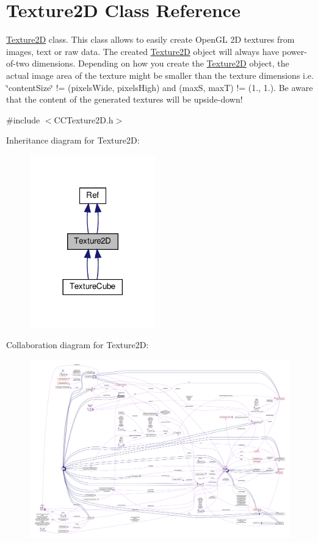 \hypertarget{classTexture2D}{}\section{Texture2D Class Reference}
\label{classTexture2D}


\hyperlink{classTexture2D}{Texture2D} class. This class allows to easily create Open\+GL 2D textures from images, text or raw data. The created \hyperlink{classTexture2D}{Texture2D} object will always have power-\/of-\/two dimensions. Depending on how you create the \hyperlink{classTexture2D}{Texture2D} object, the actual image area of the texture might be smaller than the texture dimensions i.\+e. \char`\"{}content\+Size\char`\"{} != (pixels\+Wide, pixels\+High) and (maxS, maxT) != (1., 1.). Be aware that the content of the generated textures will be upside-\/down!  




{\ttfamily \#include $<$C\+C\+Texture2\+D.\+h$>$}



Inheritance diagram for Texture2D\+:
\nopagebreak
\begin{figure}[H]
\begin{center}
\leavevmode
\includegraphics[width=153pt]{classTexture2D__inherit__graph}
\end{center}
\end{figure}


Collaboration diagram for Texture2D\+:
\nopagebreak
\begin{figure}[H]
\begin{center}
\leavevmode
\includegraphics[width=350pt]{classTexture2D__coll__graph}
\end{center}
\end{figure}
